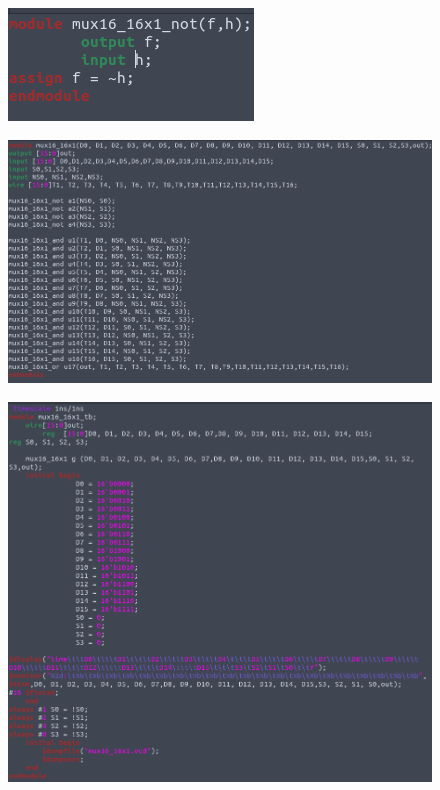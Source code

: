 \documentclass[11pt,a4paper]{article}
\begin{document}
\begin{enumerate}
\begin{enumerate}[label=(\alph*)]
\begin{figure}[h!]
\centering
\includegraphics[scale=0.7]{16_16x1MUX_3.png} 
\end{figure}
\begin{figure}[h!]
\centering
\includegraphics[scale=0.4]{16_16x1MUX_4.png} 
\end{figure}
\begin{figure}[h!]
\centering
\includegraphics[scale=0.4]{16_16x1MUX_5.png} 
\end{figure}

\end{enumerate}
\end{enumerate}
\end{document}

